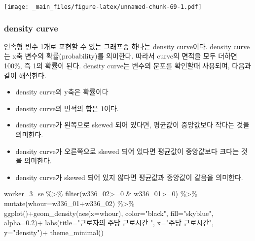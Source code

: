 \documentclass[
]{book}
\newenvironment{Shaded}{\begin{snugshade}}{\end{snugshade}}
\newcommand{\AttributeTok}[1]{\textcolor[rgb]{0.77,0.63,0.00}{#1}}
\newcommand{\DecValTok}[1]{\textcolor[rgb]{0.00,0.00,0.81}{#1}}
\newcommand{\FloatTok}[1]{\textcolor[rgb]{0.00,0.00,0.81}{#1}}
\newcommand{\FunctionTok}[1]{\textcolor[rgb]{0.00,0.00,0.00}{#1}}
\newcommand{\NormalTok}[1]{#1}
\newcommand{\SpecialCharTok}[1]{\textcolor[rgb]{0.00,0.00,0.00}{#1}}
\newcommand{\StringTok}[1]{\textcolor[rgb]{0.31,0.60,0.02}{#1}}
\providecommand{\tightlist}{%
  \setlength{\itemsep}{0pt}\setlength{\parskip}{0pt}}
\theoremstyle{definition}
\theoremstyle{definition}
\theoremstyle{definition}
\theoremstyle{definition}
\theoremstyle{remark}
\begin{document}
\texttt{[image: \_main\_files/figure-latex/unnamed-chunk-69-1.pdf]}

\hypertarget{density-curve}{%
\subsubsection{density curve}\label{density-curve}}

연속형 변수 1개로 표현할 수 있는 그래프중 하나는 density curve이다. density curve는 x축 변수의 확률(probability)를 의미한다. 따라서 curve의 면적을 모두 더하면 100\%, 즉 1의 확률이 된다. density curve는 변수의 분포를 확인할때 사용되며, 다음과 같이 해석한다.

\begin{itemize}
\tightlist
\item
  density curve의 y축은 확률이다
\item
  density curve의 면적의 합은 1이다.
\item
  density curve가 왼쪽으로 skewed 되어 있다면, 평균값이 중앙값보다 작다는 것을 의미한다.
\item
  density curve가 오른쪽으로 skewed 되어 있다면 평균값이 중앙값보다 크다는 것을 의미한다.
\item
  density curve가 skewed 되어 있지 않다면 평균값과 중앙값이 같음을 의미한다.
\end{itemize}

\begin{Shaded}
\begin{Highlighting}[]
\NormalTok{worker\_3\_se }\SpecialCharTok{\%\textgreater{}\%} 
  \FunctionTok{filter}\NormalTok{(w336\_02}\SpecialCharTok{\textgreater{}=}\DecValTok{0} \SpecialCharTok{\&}\NormalTok{ w336\_01}\SpecialCharTok{\textgreater{}=}\DecValTok{0}\NormalTok{) }\SpecialCharTok{\%\textgreater{}\%} 
  \FunctionTok{mutate}\NormalTok{(}\AttributeTok{whour=}\NormalTok{w336\_01}\SpecialCharTok{+}\NormalTok{w336\_02) }\SpecialCharTok{\%\textgreater{}\%} 
  \FunctionTok{ggplot}\NormalTok{()}\SpecialCharTok{+}\FunctionTok{geom\_density}\NormalTok{(}\FunctionTok{aes}\NormalTok{(}\AttributeTok{x=}\NormalTok{whour), }\AttributeTok{color=}\StringTok{"black"}\NormalTok{, }\AttributeTok{fill=}\StringTok{"skyblue"}\NormalTok{, }\AttributeTok{alpha=}\FloatTok{0.2}\NormalTok{)}\SpecialCharTok{+}
  \FunctionTok{labs}\NormalTok{(}\AttributeTok{title=}\StringTok{"근로자의 주당 근로시간 "}\NormalTok{, }\AttributeTok{x=}\StringTok{"주당 근로시간"}\NormalTok{, }\AttributeTok{y=}\StringTok{"density"}\NormalTok{)}\SpecialCharTok{+}
  \FunctionTok{theme\_minimal}\NormalTok{()}
\end{Highlighting}
\end{Shaded}
\end{document}
